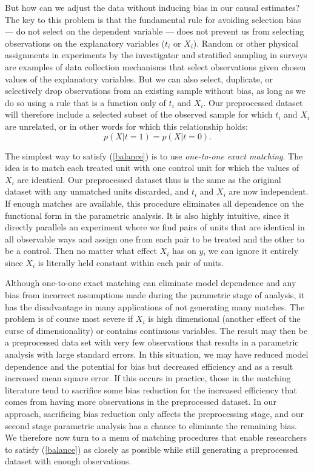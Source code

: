 \documentclass[11pt,titlepage]{article}
\begin{document}
But how can we adjust the data without inducing bias in our causal
estimates?  The key to this problem is that the fundamental rule for
avoiding selection bias --- do not select on the dependent variable
--- does not prevent us from selecting observations on the explanatory
variables ($t_i$ or $X_i$).  Random or other physical assignments in
experiments by the investigator and stratified sampling in surveys are
examples of data collection mechanisms that select observations given
chosen values of the explanatory variables.  But we can also select,
duplicate, or selectively drop observations from an existing sample
without bias, as long as we do so using a rule that is a function only
of $t_i$ and $X_i$.  Our preprocessed dataset will therefore include a
selected subset of the observed sample for which $t_i$ and $X_i$ are
unrelated, or in other words for which this relationship holds:
\begin{equation}
  \label{balance}
  p(X|t=1) = p(X|t=0).
\end{equation}

The simplest way to satisfy (\ref{balance}) is to use \emph{one-to-one
  exact matching}.  The idea is to match each treated unit with one
control unit for which the values of $X_i$ are identical.  Our
preprocessed dataset thus is the same as the original dataset with any
unmatched units discarded, and $t_i$ and $X_i$ are now independent.
If enough matches are available, this procedure eliminates all
dependence on the functional form in the parametric analysis.  It is
also highly intuitive, since it directly parallels an experiment where
we find pairs of units that are identical in all observable ways and
assign one from each pair to be treated and the other to be a control.
Then no matter what effect $X_i$ has on $y$, we can ignore it entirely
since $X_i$ is literally held constant within each pair of units.

Although one-to-one exact matching can eliminate model dependence and
any bias from incorrect assumptions made during the parametric stage
of analysis, it has the disadvantage in many applications of not
generating many matches.  The problem is of course most severe if
$X_i$ is high dimensional (another effect of the curse of
dimensionality) or contains continuous variables.  The result may then
be a preprocessed data set with very few observations that results in
a parametric analysis with large standard errors.  In this situation,
we may have reduced model dependence and the potential for bias but
decreased efficiency and as a result increased mean square error.  If
this occurs in practice, those in the matching literature tend to
sacrifice some bias reduction for the increased efficiency that comes
from having more observations in the preprocessed dataset.  In our
approach, sacrificing bias reduction only affects the preprocessing
stage, and our second stage parametric analysis has a chance to
eliminate the remaining bias.  We therefore now turn to a menu of
matching procedures that enable researchers to satisfy (\ref{balance})
as closely as possible while still generating a preprocessed dataset
with enough observations.
\end{document}

